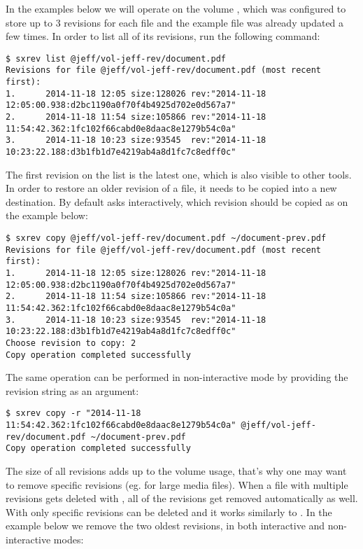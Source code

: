 In the examples below we will operate on the volume , which
was configured to store up to 3 revisions for each file and the example file
 was already updated a few times. In order to list all of
its revisions, run the following command:
\begin{lstlisting}
$ sxrev list @jeff/vol-jeff-rev/document.pdf
Revisions for file @jeff/vol-jeff-rev/document.pdf (most recent first):
1.      2014-11-18 12:05 size:128026 rev:"2014-11-18 12:05:00.938:d2bc1190a0f70f4b4925d702e0d567a7"
2.      2014-11-18 11:54 size:105866 rev:"2014-11-18 11:54:42.362:1fc102f66cabd0e8daac8e1279b54c0a"
3.      2014-11-18 10:23 size:93545  rev:"2014-11-18 10:23:22.188:d3b1fb1d7e4219ab4a8d1fc7c8edff0c"
\end{lstlisting}
The first revision on the list is the latest one, which is also visible to
other tools. In order to restore an older revision of a file, it needs to
be copied into a new destination. By default  asks interactively,
which revision should be copied as on the example below:
\begin{lstlisting}
$ sxrev copy @jeff/vol-jeff-rev/document.pdf ~/document-prev.pdf
Revisions for file @jeff/vol-jeff-rev/document.pdf (most recent first):
1.      2014-11-18 12:05 size:128026 rev:"2014-11-18 12:05:00.938:d2bc1190a0f70f4b4925d702e0d567a7"
2.      2014-11-18 11:54 size:105866 rev:"2014-11-18 11:54:42.362:1fc102f66cabd0e8daac8e1279b54c0a"
3.      2014-11-18 10:23 size:93545  rev:"2014-11-18 10:23:22.188:d3b1fb1d7e4219ab4a8d1fc7c8edff0c"
Choose revision to copy: 2
Copy operation completed successfully
\end{lstlisting}
The same operation can be performed in non-interactive mode by providing
the revision string as an argument:
\begin{lstlisting}
$ sxrev copy -r "2014-11-18 11:54:42.362:1fc102f66cabd0e8daac8e1279b54c0a" @jeff/vol-jeff-rev/document.pdf ~/document-prev.pdf
Copy operation completed successfully
\end{lstlisting}
The size of all revisions adds up to the volume usage, that's why one may want
to remove specific revisions (eg. for large media files). When a file with
multiple revisions gets deleted with , all of the revisions get
removed automatically as well. With  only specific revisions
can be deleted and it works similarly to . In the example
below we remove the two oldest revisions, in both interactive and
non-interactive modes:
